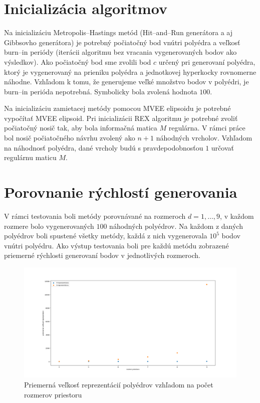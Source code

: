 \section{Inicializácia algoritmov}

Na inicializáciu Metropolis--Hastings metód (Hit--and--Run generátora a aj Gibbsovho generátora) je potrebný počiatočný bod vnútri polyédra a veľkosť burn--in periódy (iterácii algoritmu bez vracania vygenerovaných bodov ako výsledkov). Ako počiatočný bod sme zvolili bod $c$ určený pri generovaní polyédra, ktorý je vygenerovaný na prieniku polyédra a jednotkovej hyperkocky rovnomerne náhodne. Vzhľadom k tomu, že generujeme veľké množstvo bodov v polyédri, je burn--in perióda nepotrebná. Symbolicky bola zvolená hodnota $100$.

Na inicializáciu zamietacej metódy pomocou MVEE elipsoidu je potrebné vypočítať MVEE elipsoid. Pri inicializácii REX algoritmu je potrebné zvoliť počiatočný nosič tak, aby bola informačná matica $M$ regulárna. V rámci práce bol nosič počiatočného návrhu zvolený ako $n+1$ náhodných vrcholov. Vzhľadom na náhodnosť polyédra, dané vrcholy budú s pravdepodobnosťou $1$ určovať regulárnu maticu $M$.

\section{Porovnanie rýchlostí generovania}

V rámci testovania boli metódy porovnávané na rozmeroch $d=1, \dots, 9$, v každom rozmere bolo vygenerovaných $100$ náhodných polyédrov. Na každom z daných polyédrov boli spustené všetky metódy, každá z nich vygenerovala $10^5$ bodov vnútri polyédru. Ako výstup testovania boli pre každú metódu zobrazené priemerné rýchlosti generovaní bodov v jednotlivých rozmeroch.\\

\begin{figure} 
	\includegraphics[width=\linewidth]{images/velkost_rep.png}
	\caption{Priemerná veľkosť reprezentácií polyédrov vzhľadom na počet rozmerov priestoru}
	\label{fig:velkost_rep}
\end{figure}

